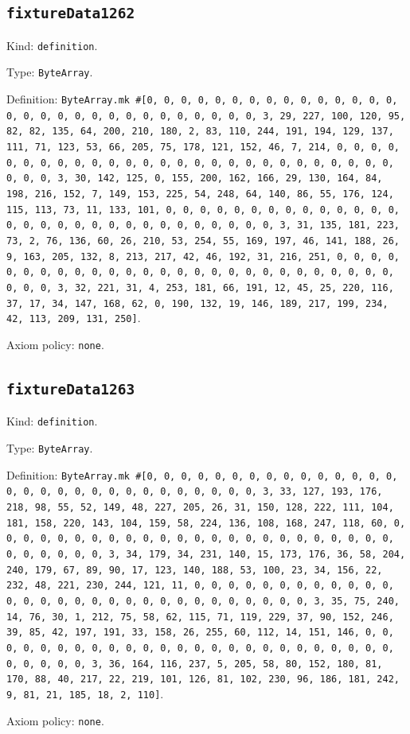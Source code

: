 \documentclass[11pt]{article}
\begin{document}
\subsection*{\texttt{fixtureData1262}}
\noindent Kind: \texttt{definition}.\par
\noindent Type: \texttt{ByteArray}.\par
\noindent Definition: \texttt{ByteArray.mk \#[0, 0, 0, 0, 0, 0, 0, 0, 0, 0, 0, 0, 0, 0, 0, 0, 0, 0, 0, 0, 0, 0, 0, 0, 0, 0, 0, 0, 0, 0, 3, 29, 227, 100, 120, 95, 82, 82, 135, 64, 200, 210, 180, 2, 83, 110, 244, 191, 194, 129, 137, 111, 71, 123, 53, 66, 205, 75, 178, 121, 152, 46, 7, 214, 0, 0, 0, 0, 0, 0, 0, 0, 0, 0, 0, 0, 0, 0, 0, 0, 0, 0, 0, 0, 0, 0, 0, 0, 0, 0, 0, 0, 0, 0, 3, 30, 142, 125, 0, 155, 200, 162, 166, 29, 130, 164, 84, 198, 216, 152, 7, 149, 153, 225, 54, 248, 64, 140, 86, 55, 176, 124, 115, 113, 73, 11, 133, 101, 0, 0, 0, 0, 0, 0, 0, 0, 0, 0, 0, 0, 0, 0, 0, 0, 0, 0, 0, 0, 0, 0, 0, 0, 0, 0, 0, 0, 0, 0, 3, 31, 135, 181, 223, 73, 2, 76, 136, 60, 26, 210, 53, 254, 55, 169, 197, 46, 141, 188, 26, 9, 163, 205, 132, 8, 213, 217, 42, 46, 192, 31, 216, 251, 0, 0, 0, 0, 0, 0, 0, 0, 0, 0, 0, 0, 0, 0, 0, 0, 0, 0, 0, 0, 0, 0, 0, 0, 0, 0, 0, 0, 0, 0, 3, 32, 221, 31, 4, 253, 181, 66, 191, 12, 45, 25, 220, 116, 37, 17, 34, 147, 168, 62, 0, 190, 132, 19, 146, 189, 217, 199, 234, 42, 113, 209, 131, 250]}.\par
\noindent Axiom policy: \texttt{none}.\par
\subsection*{\texttt{fixtureData1263}}
\noindent Kind: \texttt{definition}.\par
\noindent Type: \texttt{ByteArray}.\par
\noindent Definition: \texttt{ByteArray.mk \#[0, 0, 0, 0, 0, 0, 0, 0, 0, 0, 0, 0, 0, 0, 0, 0, 0, 0, 0, 0, 0, 0, 0, 0, 0, 0, 0, 0, 0, 0, 3, 33, 127, 193, 176, 218, 98, 55, 52, 149, 48, 227, 205, 26, 31, 150, 128, 222, 111, 104, 181, 158, 220, 143, 104, 159, 58, 224, 136, 108, 168, 247, 118, 60, 0, 0, 0, 0, 0, 0, 0, 0, 0, 0, 0, 0, 0, 0, 0, 0, 0, 0, 0, 0, 0, 0, 0, 0, 0, 0, 0, 0, 0, 0, 3, 34, 179, 34, 231, 140, 15, 173, 176, 36, 58, 204, 240, 179, 67, 89, 90, 17, 123, 140, 188, 53, 100, 23, 34, 156, 22, 232, 48, 221, 230, 244, 121, 11, 0, 0, 0, 0, 0, 0, 0, 0, 0, 0, 0, 0, 0, 0, 0, 0, 0, 0, 0, 0, 0, 0, 0, 0, 0, 0, 0, 0, 0, 0, 3, 35, 75, 240, 14, 76, 30, 1, 212, 75, 58, 62, 115, 71, 119, 229, 37, 90, 152, 246, 39, 85, 42, 197, 191, 33, 158, 26, 255, 60, 112, 14, 151, 146, 0, 0, 0, 0, 0, 0, 0, 0, 0, 0, 0, 0, 0, 0, 0, 0, 0, 0, 0, 0, 0, 0, 0, 0, 0, 0, 0, 0, 0, 0, 3, 36, 164, 116, 237, 5, 205, 58, 80, 152, 180, 81, 170, 88, 40, 217, 22, 219, 101, 126, 81, 102, 230, 96, 186, 181, 242, 9, 81, 21, 185, 18, 2, 110]}.\par
\noindent Axiom policy: \texttt{none}.\par
\end{document}
